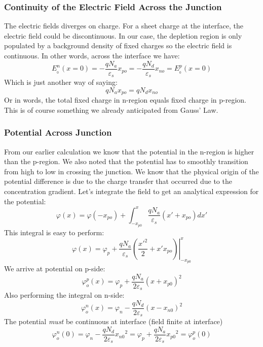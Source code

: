 \subsubsection{Continuity of the Electric Field Across the Junction}

The electric fields diverges on charge. For a sheet charge at the interface, the electric field could be discontinuous.   In our case, the depletion region is only populated by a background density of fixed charges so the electric field is continuous.  In other words, across the interface we have:
\begin{equation} 
	E_{_0}^n(x = 0) =  - \frac{{q{N_a}}}{{{\varepsilon _s}}}{x_{po}} =  - \frac{{q{N_d}}}{{{\varepsilon _s}}}{x_{no}} = E_{_0}^p(x = 0) 
\end{equation}
Which is just another way of saying:
%
\begin{equation} 
	q{N_a}{x_{po}} = q{N_d}{x_{no}} 
\end{equation}
Or in words, the total fixed charge in n-region equals fixed charge in p-region.  This is of course something we already anticipated from Gauss' Law.
 


\subsubsection{Potential Across Junction}

From our earlier calculation we know that the potential in the n-region is higher than the  p-region.  We also noted that the potential has to smoothly transition from high to low in crossing the junction.   We know that the physical origin of the potential difference is due to the charge transfer that occurred due to the concentration gradient.   Let's integrate the field to get an analytical expression for the potential:
% 
\begin{equation}
	\varphi (x) = \varphi ( - {x_{po}}) + \int_{ - {x_{p0}}}^x {\frac{{q{N_a}}}{{{\varepsilon _s}}}(x' + {x_{po}})dx'} 
\end{equation}
%
This integral is easy to perform:
%
\begin{equation} 
	\varphi (x) = {\varphi _p} + \left. {\frac{{q{N_a}}}{{{\varepsilon _s}}}\left( {\frac{{x{'^2}}}{2} + x'{x_{po}}} \right)} \right|_{ - {x_{p0}}}^x 
\end{equation}
%
We arrive at potential on p-side:
%
\begin{equation}
	\varphi _o^p(x) = {\varphi _p} + \frac{{q{N_a}}}{{2{\varepsilon _s}}}{(x + {x_{p0}})^2} 
\end{equation}
%
Also performing the integral on n-side:
\begin{equation}
	\varphi _o^n(x) = {\varphi _n} - \frac{{q{N_d}}}{{2{\varepsilon _s}}}{(x - {x_{n0}})^2} 
\end{equation}
%
The potential \textit{must} be continuous at interface (field finite at interface)
%
\begin{equation}
	\varphi _o^n(0) = {\varphi _n} - \frac{{q{N_d}}}{{2{\varepsilon _s}}}{{x_{n0}}^2} 
	= {\varphi _p} + \frac{{q{N_a}}}{{2{\varepsilon _s}}}{{x_{p0}}^2} =
	\varphi _o^p(0)
\end{equation}
 
